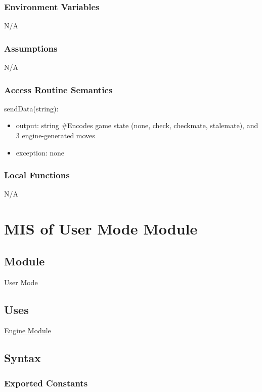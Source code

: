 \documentclass[12pt, titlepage]{article}
\begin{document}
    \subsubsection{Environment Variables}
    N/A

    \subsubsection{Assumptions}
    N/A

    \subsubsection{Access Routine Semantics}
        \noindent sendData(string):
        \begin{itemize}
            \item output: string \#Encodes game state (none, check, 
                checkmate, stalemate), and 3 engine-generated moves
            \item exception: none
        \end{itemize}

    \subsubsection{Local Functions}
    N/A

    \newpage

\section{MIS of User Mode Module} \label{mMode}

    \subsection{Module}
    User Mode

    \subsection{Uses}
    \hyperref[mEngine]{Engine Module}

    \subsection{Syntax}
    \subsubsection{Exported Constants}
\end{document}
